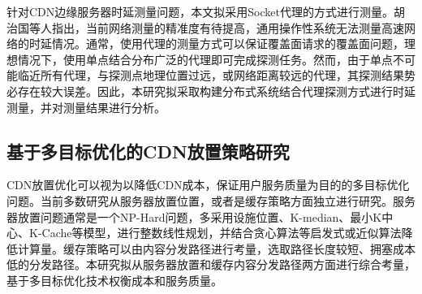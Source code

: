 针对CDN边缘服务器时延测量问题，本文拟采用Socket代理的方式进行测量。胡治国\cite{胡治国2017IP}等人指出，当前网络测量的精准度有待提高，通用操作性系统无法测量高速网络的时延情况。通常，使用代理的测量方式可以保证覆盖面请求的覆盖面问题，理想情况下，使用单点结合分布广泛的代理即可完成探测任务。然而，由于单点不可能临近所有代理，与探测点地理位置过远，或网络距离较远的代理，其探测结果势必存在较大误差。因此，本研究拟采取构建分布式系统结合代理探测方式进行时延测量，并对测量结果进行分析。

\subsection{基于多目标优化的CDN放置策略研究}

CDN放置优化可以视为以降低CDN成本，保证用户服务质量为目的的多目标优化问题。当前多数研究从服务器放置位置，或者是缓存策略方面独立进行研究。服务器放置问题通常是一个NP-Hard问题，多采用设施位置、K-median、最小K中心、K-Cache等模型，进行整数线性规划，并结合贪心算法等启发式或近似算法降低计算量。缓存策略可以由内容分发路径进行考量，选取路径长度较短、拥塞成本低的分发路径。本研究拟从服务器放置和缓存内容分发路径两方面进行综合考量，基于多目标优化技术权衡成本和服务质量。


